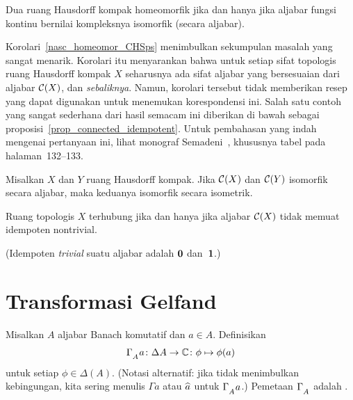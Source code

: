 \begin{cor}\label{nasc_homeomor_CHSps} Dua ruang Hausdorff kompak homeomorfik jika dan hanya jika aljabar
fungsi kontinu bernilai kompleksnya isomorfik (secara aljabar).
\end{cor}

Korolari~\ref{nasc_homeomor_CHSps} menimbulkan sekumpulan masalah yang sangat menarik. Korolari itu menyarankan
bahwa untuk setiap sifat topologis ruang Hausdorff kompak $X$ seharusnya ada sifat aljabar yang bersesuaian
dari aljabar $\mathcal{C}(X)$, dan \emph{sebaliknya}. Namun, korolari tersebut tidak memberikan resep yang dapat
digunakan untuk menemukan korespondensi ini. Salah satu contoh yang sangat sederhana dari hasil semacam ini
diberikan di bawah sebagai proposisi~\ref{prop_connected_idempotent}. Untuk pembahasan yang indah mengenai
pertanyaan ini, lihat monograf Semadeni~\cite{Semadeni:1971}, khususnya tabel pada halaman~132--133.

\begin{cor} Misalkan $X$ dan $Y$ ruang Hausdorff kompak. Jika $\mathcal{C}(X)$ dan $\mathcal{C}(Y)$ isomorfik
secara aljabar, maka keduanya isomorfik secara isometrik.
\end{cor}

\begin{prop}\label{prop_connected_idempotent} Ruang topologis $X$ terhubung jika dan hanya jika aljabar $\mathcal{C}(X)$
tidak memuat idempoten nontrivial.
\end{prop}

(Idempoten \emph{trivial} suatu aljabar adalah $\mathbf{0}$ dan~$\mathbf{1}$.)













\section{Transformasi Gelfand}
\begin{defn} Misalkan $A$ aljabar Banach komutatif dan $a\in A$. Definisikan
   \[\Gamma_{{}_{\scriptstyle{A}}} a\colon \Delta A \rightarrow \mathbb{C} \colon \phi \mapsto \phi(a) \]
untuk setiap $\phi \in \Delta(A)$. (Notasi alternatif: jika tidak menimbulkan kebingungan, kita
sering menulis $\Gamma a$ atau $\widehat{a}$ untuk $\Gamma_{{}_{\scriptstyle{A}}} a$.) Pemetaan $\Gamma_{{}_{\scriptstyle{A}}}$ adalah
.
\end{defn}

